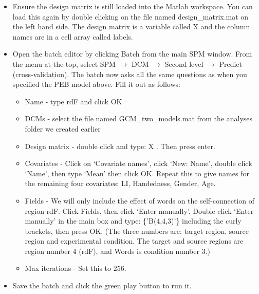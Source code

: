 \documentclass{article}
\begin{document}
\begin{itemize}
    \item Ensure the design matrix is still loaded into the Matlab workspace. You can load this again by double clicking on the file named design\_matrix.mat on the left hand side. The design matrix is a variable called X and the column names are in a cell array called labels.
    
    \item Open the batch editor by clicking Batch from the main SPM window. From the menu at the top, select SPM $\rightarrow$ DCM $\rightarrow$ Second level $\rightarrow$ Predict (cross-validation). The batch now asks all the same questions as when you specified the PEB model above. Fill it out as follows:
    \begin{itemize}
        \item Name - type rdF and click OK
        
        \item DCMs - select the file named GCM\_two\_models.mat from the analyses folder we created earlier
        
        \item Design matrix - double click and type: X  . Then press enter.
        
        \item Covariates - Click on `Covariate names', click `New: Name', double click `Name', then type `Mean' then click OK.  Repeat this to give names for the remaining four covariates: LI, Handedness, Gender, Age.
        
        \item Fields - We will only include the effect of words on the self-connection of region rdF. Click Fields, then click `Enter manually'. Double click `Enter manually' in the main box and type: \{{'B(4,4,3)'}\} including the curly brackets, then press OK. (The three numbers are: target region, source region and experimental condition. The target and source regions are region number 4 (rdF), and Words is condition number 3.)
        
        \item Max iterations - Set this to 256.

    \end{itemize}
    
    \item Save the batch and click the green play button to run it.
    
\end{itemize}
\end{document}
